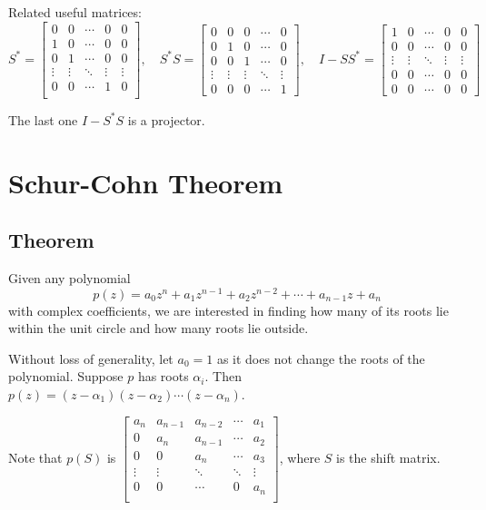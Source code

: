 \documentclass[twofold]{article}
\newcommand*\adj[1]{#1^*}
\theoremstyle{plain}
\theoremstyle{definition}
\theoremstyle{remark}
\begin{document}
Related useful matrices: 
\[\adj{S} =  \begin{bmatrix} 
0 & 0 & \cdots & 0 & 0 \\
1 & 0 & \cdots & 0 & 0 \\
0 & 1 & \cdots & 0 & 0 \\
\vdots & \vdots & \ddots &\vdots & \vdots \\
0 & 0 & \cdots & 1 & 0 \\ 
\end{bmatrix}, \quad 
\adj{S} S  =  \begin{bmatrix} 
0 & 0 & 0 & \cdots & 0 \\
0 & 1 & 0 & \cdots & 0 \\
0 & 0 & 1 & \cdots & 0 \\
\vdots & \vdots & \vdots & \ddots & \vdots \\
0 & 0 & 0 & \cdots & 1
\end{bmatrix}, \quad 
 I - S \adj{S} =  \begin{bmatrix} 
1 & 0 & \cdots & 0 & 0 \\
0 & 0 & \cdots & 0 & 0 \\
\vdots & \vdots & \ddots &\vdots & \vdots \\
0 & 0 & \cdots & 0 & 0 \\ 
0 & 0 & \cdots & 0 & 0
\end{bmatrix}\]

The last one \(I - \adj{S} S\) is a projector. 


\section{Schur-Cohn Theorem}

\subsection{Theorem}
Given any polynomial \[p(z) = a_0 z^n + a_1z^{n-1} + a_2 z^{n-2} + \cdots +  a_{n-1} z + a_n\] with complex coefficients, we are interested in finding how many of its roots lie within the unit circle and how many roots lie outside.

 Without loss of generality, let \(a_0 = 1\) as it does not change the roots of the polynomial. Suppose \(p\) has roots \(\alpha_i\). Then \(p(z) = (z - \alpha_1) (z - \alpha_2) \cdots (z - \alpha_n)\). 

Note that \(p(S) \) is \( \begin{bmatrix} 

a_n & a_{n-1} & a_{n-2} & \cdots & a_1 \\
0 & a_n & a_{n-1} & \cdots & a_2 \\
0 & 0 & a_n & \cdots & a_3 \\
\vdots & \vdots & \ddots &\ddots & \vdots \\
0 & 0 & \cdots & 0 & a_n \\ 
\end{bmatrix}\), where \(S\) is the shift matrix. 
\end{document}
